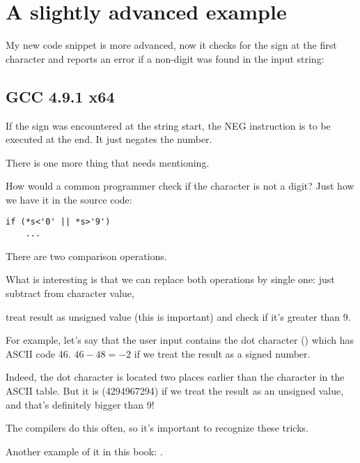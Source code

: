 \section{A slightly advanced example}

My new code snippet is more advanced, now it checks for the  sign at the first character
and reports an error if a non-digit was found in the input string:



\subsection{\Optimizing GCC 4.9.1 x64}




If the  sign was encountered at the string start, the NEG instruction is to be executed at the end.
It just negates the number.

\label{one_comparison_instead_of_two}
There is one more thing that needs mentioning.

How would a common programmer check if the character is not a digit?
Just how we have it in the source code:

\begin{lstlisting}
if (*s<'0' || *s>'9')
    ...
\end{lstlisting}

There are two comparison operations.

What is interesting is that we can replace both operations by single one:
just subtract  from character value,

treat result as unsigned value (this is important) and check if it's greater than 9.

For example, let's say that the user input contains the dot character () which has \ac{ASCII} code 46.
$46-48=-2$ if we treat the result as a signed number.

Indeed, the dot character is located two places earlier than the  character in the \ac{ASCII} table.
But it is  (4294967294) 
if we treat the result as an unsigned value, and that's definitely bigger than 9!

The compilers do this often, so it's important to recognize these tricks.

Another example of it in this book: 
.

